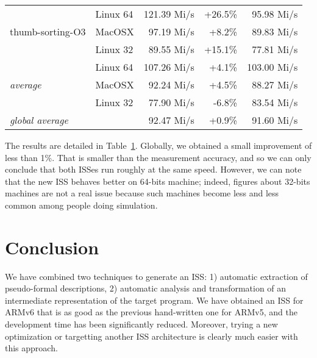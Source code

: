 \documentclass[conference]{ieeeconf}
\begin{document}
\begin{table}
\begin{tabular}{l|l|rr|r}
\multirow{3}{*}{thumb-sorting-O3} & Linux 64  & 121.39 Mi/s\hspace*{-2.5mm} &\hspace*{-2.5mm}+26.5\% & 95.98 Mi/s  \\
                                  & MacOSX    & 97.19 Mi/s\hspace*{-2.5mm}  & +8.2\% & 89.83 Mi/s  \\
                                  & Linux 32  & 89.55 Mi/s\hspace*{-2.5mm}  &\hspace*{-2.5mm}+15.1\% & 77.81 Mi/s  \\\hline

\multirow{3}{*}{\em average}      & Linux 64  & 107.26 Mi/s\hspace*{-2.5mm} & +4.1\% & 103.00 Mi/s \\
                                  & MacOSX    &  92.24 Mi/s\hspace*{-2.5mm} & +4.5\% &  88.27 Mi/s \\
                                  & Linux 32  &  77.90 Mi/s\hspace*{-2.5mm} & -6.8\% &  83.54 Mi/s \\\hline

\multicolumn{2}{l|}{\em global average}       &  92.47 Mi/s\hspace*{-2.5mm} & +0.9\% &  91.60 Mi/s \\
\end{tabular}
\label{t:speed}
\end{table}

The results are detailed in Table~\ref{t:speed}. Globally, we obtained a small
improvement of less than 1\%. That is smaller than the measurement accuracy, and
so we can only conclude that both ISSes run roughly at the same speed. However,
we can note that the new ISS behaves better on 64-bits machine;
indeed, figures about 32-bits machines are not a real issue
because such machines become less and less common among people doing
simulation.



\section{Conclusion}
\label{s:concl}

We have combined two techniques to generate an ISS: 1)
automatic extraction of pseudo-formal descriptions, 2) automatic analysis and
transformation of an intermediate representation of the target program. We have
obtained an ISS for ARMv6 that is as good as the previous hand-written one for ARMv5,
and the development time has been significantly reduced.
Moreover, trying a new optimization or targetting another ISS architecture
is clearly much easier with this approach.
\end{document}
